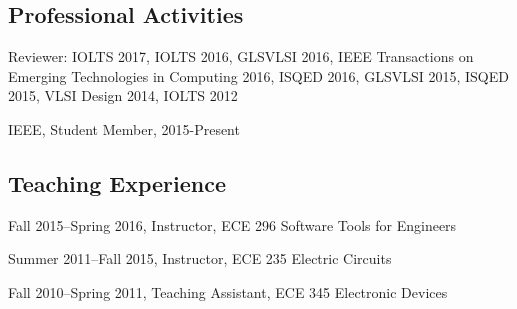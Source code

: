 \documentclass[letterpaper]{article}
\renewenvironment{itemize}{
  \begin{list}{}{
    \setlength{\leftmargin}{1.5em}
  }
}{
  \end{list}
}
\begin{document}
\subsection*{Professional Activities}

\begin{itemize}
	\item Reviewer: IOLTS 2017, IOLTS 2016, GLSVLSI 2016,  IEEE Transactions on Emerging Technologies in Computing 2016, ISQED 2016, GLSVLSI 2015, ISQED 2015, VLSI Design 2014, IOLTS 2012
	\item IEEE, Student Member, 2015-Present
\end{itemize}

\subsection*{Teaching Experience}

\begin{itemize}
	\item Fall 2015--Spring 2016, Instructor, ECE 296 Software Tools for Engineers
	\item Summer 2011--Fall 2015, Instructor, ECE 235 Electric Circuits
	\item Fall 2010--Spring 2011, Teaching Assistant, ECE 345 Electronic Devices

\end{itemize}
\end{document}
